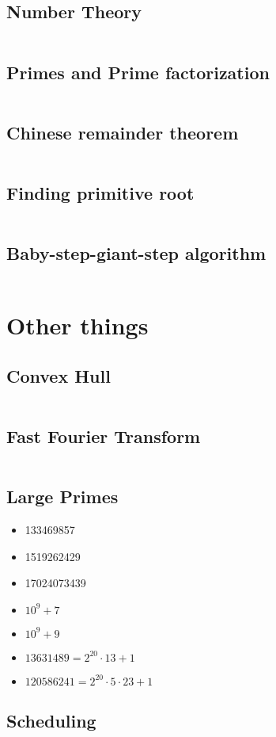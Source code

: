 \documentclass[8pt,a4paper,landscape,oneside]{amsart}
\newcommand{\codec}[1]{\inputminted[fontsize=\large,tabsize=2,baselinestretch=1]{cpp}{code/#1}}
\newcommand{\codep}[1]{\inputminted[fontsize=\large,tabsize=2,baselinestretch=1]{py}{code/#1}}
\begin{document}
\begin{multicols*}{2}
\begin{large}
\subsection{Number Theory}
\codep{gcdbezout.py}
\subsection{Primes and Prime factorization}
\codep{primecalc.py}
\subsection{Chinese remainder theorem}
\codep{crt.py}
\subsection{Finding primitive root}
\codep{primitiveroot.py}
\subsection{Baby-step-giant-step algorithm}
\codep{babystepgiantstep.py}
\section{Other things}
\subsection{Convex Hull}
\codep{convexhull.py}
\subsection{Fast Fourier Transform}
\codec{fft.cpp}
\subsection{Large Primes}
\begin{itemize}
    \item 133469857
    \item 1519262429
    \item 17024073439
    \item $10^9+7$
    \item $10^9+9$
    \item $13631489 = 2^{20}\cdot 13 + 1$
    \item $120586241 = 2^{20}\cdot 5\cdot 23 + 1$
\end{itemize}
\subsection{Scheduling}
\codec{scheduling.cpp}

\end{large}
\end{multicols*}
\end{document}
